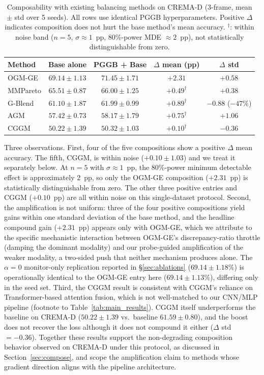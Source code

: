 \documentclass{article}
\begin{document}
\begin{table}[H]
\centering
\caption{Composability with existing balancing methods on CREMA-D (3-frame, mean $\pm$ std over 5 seeds). All rows use identical PGGB hyperparameters. Positive $\Delta$ indicates composition does not hurt the base method's mean accuracy. $^\dagger$: within noise band ($n{=}5$, $\sigma \approx 1$~pp, 80\%-power MDE $\approx 2$~pp), not statistically distinguishable from zero.}
\label{tab:composability}
\begin{tabular}{lcccc}
\toprule
\textbf{Method} & \textbf{Base alone} & \textbf{PGGB + Base} & \textbf{$\Delta$ mean (pp)} & \textbf{$\Delta$ std} \\
\midrule
OGM-GE   & $69.14 \pm 1.13$ & $71.45 \pm 1.71$ & $\mathbf{+2.31}$ & $+0.58$ \\
MMPareto & $65.51 \pm 0.87$ & $66.00 \pm 1.25$ & $+0.49^\dagger$ & $+0.38$ \\
G-Blend  & $61.10 \pm 1.87$ & $61.99 \pm 0.99$ & $+0.89^\dagger$ & $\mathbf{-0.88}$ ($-47\%$) \\
AGM      & $57.42 \pm 0.73$ & $58.17 \pm 1.79$ & $+0.75^\dagger$ & $+1.06$ \\
CGGM     & $50.22 \pm 1.39$ & $50.32 \pm 1.03$ & $+0.10^\dagger$ & $-0.36$ \\
\bottomrule
\end{tabular}
\end{table}

Three observations. First, four of the five compositions show a positive $\Delta$ mean accuracy. The fifth, CGGM, is within noise ($+0.10 \pm 1.03$) and we treat it separately below. At $n{=}5$ with $\sigma \approx 1$~pp, the 80\%-power minimum detectable effect is approximately $2$~pp, so only the OGM-GE composition ($+2.31$~pp) is statistically distinguishable from zero. The other three positive entries and CGGM ($+0.10$~pp) are all within noise on this single-dataset protocol. Second, the amplification is not uniform: three of the four positive compositions yield gains within one standard deviation of the base method, and the headline compound gain ($+2.31$~pp) appears only with OGM-GE, which we attribute to the specific mechanistic interaction between OGM-GE's discrepancy-ratio throttle (damping the dominant modality) and our probe-guided amplification of the weaker modality, a two-sided push that neither mechanism produces alone. The $\alpha{=}0$ monitor-only replication reported in \S\ref{sec:ablations} ($69.14 \pm 1.18\%$) is operationally identical to the OGM-GE entry here ($69.14 \pm 1.13\%$), differing only in the seed set. Third, the CGGM result is consistent with CGGM's reliance on Transformer-based attention fusion, which is not well-matched to our CNN/MLP pipeline (footnote to Table~\ref{tab:main_results}). CGGM itself underperforms the baseline on CREMA-D ($50.22 \pm 1.39$ vs.\ baseline $61.59 \pm 0.80$), and the boost does not recover the loss although it does not compound it either ($\Delta$ std $=-0.36$). Together these results support the non-degrading composition behavior observed on CREMA-D under this protocol, as discussed in Section~\ref{sec:compose}, and scope the amplification claim to methods whose gradient direction aligns with the pipeline architecture.
\end{document}
